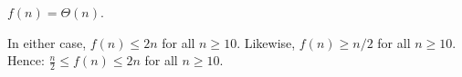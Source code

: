 \begin{prob}
\begin{subprobset}
\begin{subprob}
            \begin{soln}
                $f(n) = \Theta(n)$.

                In either case, $f(n) \leq 2n$ for all $n \geq 10$.
                Likewise, $f(n) \geq n/2$ for all $n \geq 10$. Hence:
                $\frac{n}{2} \leq f(n) \leq 2n$ for all $n \geq 10$.
            \end{soln}
        \end{subprob}
    \end{subprobset}
\end{prob}
